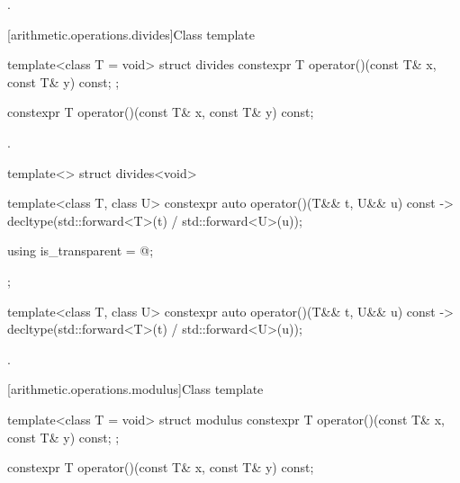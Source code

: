 \begin{itemdescr}
\pnum
\returns
{}.
\end{itemdescr}

[arithmetic.operations.divides]{Class template }

%
\begin{itemdecl}
template<class T = void> struct divides {
  constexpr T operator()(const T& x, const T& y) const;
};
\end{itemdecl}

%
\begin{itemdecl}
constexpr T operator()(const T& x, const T& y) const;
\end{itemdecl}

\begin{itemdescr}
\pnum
\returns
{}.
\end{itemdescr}

%
\begin{itemdecl}
template<> struct divides<void> {
  template<class T, class U> constexpr auto operator()(T&& t, U&& u) const
    -> decltype(std::forward<T>(t) / std::forward<U>(u));

  using is_transparent = @\unspec@;
};
\end{itemdecl}

%
\begin{itemdecl}
template<class T, class U> constexpr auto operator()(T&& t, U&& u) const
    -> decltype(std::forward<T>(t) / std::forward<U>(u));
\end{itemdecl}

\begin{itemdescr}
\pnum
\returns
{}.
\end{itemdescr}

[arithmetic.operations.modulus]{Class template }

%
\begin{itemdecl}
template<class T = void> struct modulus {
  constexpr T operator()(const T& x, const T& y) const;
};
\end{itemdecl}

%
\begin{itemdecl}
constexpr T operator()(const T& x, const T& y) const;
\end{itemdecl}

